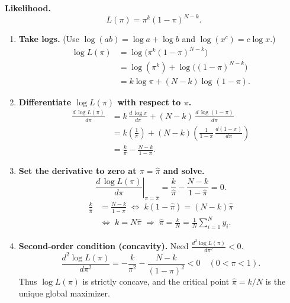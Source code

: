 \documentclass[border=3bp]{standalone}
\begin{document}
\begin{minipage}{4.5in}
\textbf{Likelihood.}
\[
L(\pi)=\pi^{k}(1-\pi)^{N-k}.
\]

\begin{enumerate}\setlength{\itemsep}{0.25em}

\item \textbf{Take logs.} (Use $\log(ab)=\log a+\log b$ and $\log(x^c)=c\log x$.)
\begingroup\setlength{\jot}{1.5pt}
\[
\begin{aligned}
\log L(\pi)
&= \log\!\big(\pi^{k}(1-\pi)^{N-k}\big)\\
&= \log(\pi^{k})+\log\!\big((1-\pi)^{N-k}\big)\\
&= k\log\pi+(N-k)\log(1-\pi).
\end{aligned}
\]
\endgroup

\item \textbf{Differentiate $\log L(\pi)$ with respect to $\pi$.}
\begingroup\setlength{\jot}{1.5pt}
\[
\begin{aligned}
\frac{d\,\log L(\pi)}{d\pi}
&= k\,\frac{d\,\log\pi}{d\pi}+(N-k)\,\frac{d\,\log(1-\pi)}{d\pi}\\
&= k\left(\frac{1}{\pi}\right)
  +(N-k)\left(\frac{1}{1-\pi}\,\frac{d(1-\pi)}{d\pi}\right)\\
&= \frac{k}{\pi}-\frac{N-k}{1-\pi}.
\end{aligned}
\]
\endgroup

\item \textbf{Set the derivative to zero at $\pi=\hat{\pi}$ and solve.}
\[
\left.\frac{d\,\log L(\pi)}{d\pi}\right|_{\pi=\hat{\pi}}
= \frac{k}{\hat{\pi}}-\frac{N-k}{1-\hat{\pi}}=0.
\]
\begingroup\setlength{\jot}{1.5pt}
\[
\begin{aligned}
\frac{k}{\hat{\pi}}&=\frac{N-k}{1-\hat{\pi}}
\;\Longleftrightarrow\; k(1-\hat{\pi})=(N-k)\hat{\pi}\\
&\Longleftrightarrow\; k=N\hat{\pi}
\;\Longrightarrow\; \hat{\pi}=\frac{k}{N}
=\frac{1}{N}\sum_{i=1}^{N}y_i.
\end{aligned}
\]
\endgroup

\item \textbf{Second-order condition (concavity).} Need $\displaystyle \frac{d^{2}\!\log L(\pi)}{d\pi^{2}}<0$.
\[
\frac{d^{2}\!\log L(\pi)}{d\pi^{2}}
= -\frac{k}{\pi^{2}}-\frac{N-k}{(1-\pi)^{2}}
<0 \quad (0<\pi<1).
\]
Thus $\log L(\pi)$ is strictly concave, and the critical point $\hat{\pi}=k/N$ is the unique global maximizer.
\end{enumerate}
\end{minipage}
\end{document}
